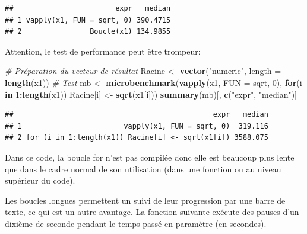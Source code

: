 \documentclass[
  12pt,
  french,
  a4paper,
  extrafontsizes,onecolumn,openright
  ]{memoir}
\newenvironment{Shaded}{\begin{snugshade}}{\end{snugshade}}
\newcommand{\CommentTok}[1]{\textcolor[rgb]{0.56,0.35,0.01}{\textit{#1}}}
\newcommand{\ControlFlowTok}[1]{\textcolor[rgb]{0.13,0.29,0.53}{\textbf{#1}}}
\newcommand{\DataTypeTok}[1]{\textcolor[rgb]{0.13,0.29,0.53}{#1}}
\newcommand{\DecValTok}[1]{\textcolor[rgb]{0.00,0.00,0.81}{#1}}
\newcommand{\KeywordTok}[1]{\textcolor[rgb]{0.13,0.29,0.53}{\textbf{#1}}}
\newcommand{\NormalTok}[1]{#1}
\newcommand{\OperatorTok}[1]{\textcolor[rgb]{0.81,0.36,0.00}{\textbf{#1}}}
\newcommand{\StringTok}[1]{\textcolor[rgb]{0.31,0.60,0.02}{#1}}
\newlength{\rf}
\begin{document}
\begin{verbatim}
##                        expr   median
## 1 vapply(x1, FUN = sqrt, 0) 390.4715
## 2                Boucle(x1) 134.9855
\end{verbatim}

\normalsize

Attention, le test de performance peut être trompeur:

\scriptsize

\begin{Shaded}
\begin{Highlighting}[]
\CommentTok{# Préparation du vecteur de résultat}
\NormalTok{Racine <-}\StringTok{ }\KeywordTok{vector}\NormalTok{(}\StringTok{"numeric"}\NormalTok{, }\DataTypeTok{length =} \KeywordTok{length}\NormalTok{(x1))}
\CommentTok{# Test}
\NormalTok{mb <-}\StringTok{ }\KeywordTok{microbenchmark}\NormalTok{(}\KeywordTok{vapply}\NormalTok{(x1, }\DataTypeTok{FUN =}\NormalTok{ sqrt, }\DecValTok{0}\NormalTok{), }
                     \ControlFlowTok{for}\NormalTok{(i }\ControlFlowTok{in} \DecValTok{1}\OperatorTok{:}\KeywordTok{length}\NormalTok{(x1)) }
\NormalTok{                       Racine[i] <-}\StringTok{ }\KeywordTok{sqrt}\NormalTok{(x1[i]))}
\KeywordTok{summary}\NormalTok{(mb)[, }\KeywordTok{c}\NormalTok{(}\StringTok{"expr"}\NormalTok{, }\StringTok{"median"}\NormalTok{)]}
\end{Highlighting}
\end{Shaded}

\begin{verbatim}
##                                               expr   median
## 1                        vapply(x1, FUN = sqrt, 0)  319.116
## 2 for (i in 1:length(x1)) Racine[i] <- sqrt(x1[i]) 3588.075
\end{verbatim}

\normalsize

Dans ce code, la boucle for n'est pas compilée donc elle est beaucoup plus lente que dans le cadre normal de son utilisation (dans une fonction ou au niveau supérieur du code).

Les boucles longues permettent un suivi de leur progression par une barre de texte, ce qui est un autre avantage.
La fonction suivante exécute des pauses d'un dixième de seconde pendant le temps passé en paramètre (en secondes).

\scriptsize
\end{document}
